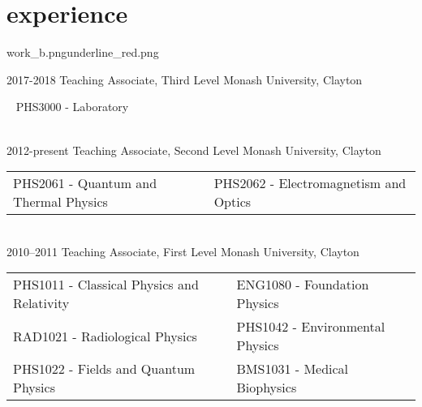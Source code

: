 \documentclass[a4paper]{friggeri-cv} %
\newcommand{\spacer}{\vspace{0.0cm}}
\begin{document}
\section{experience}{work_b.png}{underline_red.png}




\begin{entrylist}
%

\entry
{2017-2018}
{Teaching {\normalfont Associate, Third Level}}
{Monash University, Clayton}
{
~
PHS3000 - Laboratory



}\\


\entry
{2012-present\phantom{X}}
{Teaching {\normalfont Associate, Second Level}}
{Monash University, Clayton}
{
\begin{tabular}{p{8cm}l}
PHS2061 - Quantum and Thermal Physics&
PHS2062 - Electromagnetism and Optics
\end{tabular}




}\\

\entry
{2010--2011}
{Teaching {\normalfont Associate, First Level}}
{Monash University, Clayton}
{
\begin{tabular}{p{8cm}l}
PHS1011 - Classical Physics and Relativity&
ENG1080 - Foundation Physics\\
RAD1021 - Radiological Physics&
PHS1042 - Environmental Physics\\
PHS1022 - Fields and Quantum Physics&
BMS1031 - Medical Biophysics
\end{tabular}
}





\end{entrylist}

\spacer
\end{document}

